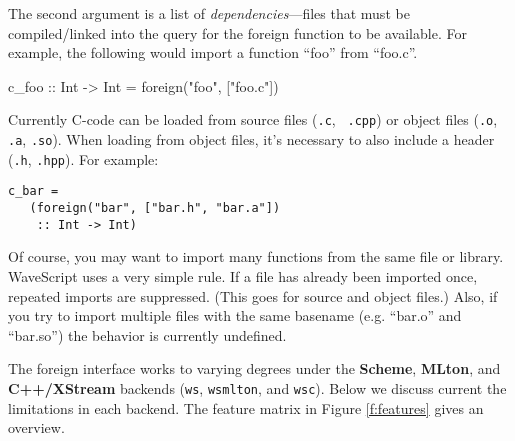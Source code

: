 The second argument is a list of {\em dependencies}---files that must
be compiled/linked into the query for the foreign function to be
available.
%
For example, the following would import a function ``foo'' from ``foo.c''.

\begin{wscode}
c\_foo :: Int -> Int = foreign("foo", ["foo.c"])
\end{wscode}


Currently C-code can be loaded from source files ({\tt .c}, {\tt
  .cpp}) or object files ({\tt .o}, {\tt .a}, {\tt .so}).  When
  loading from object files, it's necessary to also include a header
  ({\tt .h}, {\tt .hpp}).  For example:

\begin{verbatim}
c_bar = 
   (foreign("bar", ["bar.h", "bar.a"]) 
    :: Int -> Int)
\end{verbatim}

Of course, you may want to import many functions from the same file or
library.  WaveScript uses a very simple rule.  If a file has already
been imported once, repeated imports are suppressed.  (This goes for
source and object files.)  Also, if you try to import multiple files with
the same basename (e.g. ``bar.o'' and ``bar.so'') the behavior is
currently undefined.

The foreign interface works to varying degrees under the {\bf Scheme},
 {\bf MLton}, and {\bf C++/XStream} backends ({\tt ws}, {\tt wsmlton},
 and {\tt wsc}).  Below we discuss current the limitations in each
 backend.  The feature matrix in Figure \ref{f:features} gives an
 overview.

